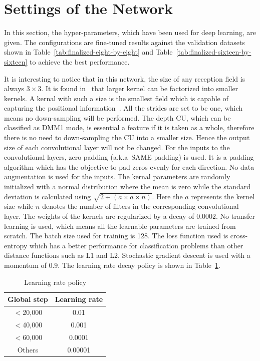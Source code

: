 \section{Settings of the Network}\label{sec:config}
In this section, the hyper-parameters, which have been
used for deep learning, are given.
The configurations are fine-tuned results against the validation
datasets shown in Table~\ref{tab:finalized-eight-by-eight}
and Table~\ref{tab:finalized-sixteen-by-sixteen} to achieve the
best performance.

It is interesting to notice that in this network, 
the size of any reception field
is always \(3\times3\).
It is found in~\parencite{RN62} that
larger kernel can be factorized into smaller kernels.
A kernal with such a size is the smallest
field which is capable of capturing the positional
information~\parencite{RN107}.
All the strides are set to be one, which means
no down-sampling will be performed.
The depth CU,
which can be classified as DMM1 mode, is essential
a feature if it is taken as a whole, therefore
there is no need to down-sampling
the CU into a smaller size.
Hence the output size of each convolutional layer
will not be changed.
For the inputs to the convolutional layers, 
zero padding (a.k.a\ SAME padding) is used.
It is a padding algorithm which has the objective
to pad zeros evenly for each direction.
No data augmentation is used for the inputs.
The kernal parameters are randomly initialized 
with a normal distribution where the mean 
is zero while the standard deviation is 
calculated using 
\(\sqrt{2\div(\mathit{a}\times\mathit{a}\times\mathit{n})}\).
Here the \(\mathit{a}\) represents the kernel size
while \(\mathit{n}\) denotes the number of filters
in the corresponding convolutional layer.
The weights of the kernels are regularized by
a decay of \(0.0002\).
No transfer learning is used, which means all the learnable 
parameters are trained from scratch.
The batch size used for training is 128.
The loss function used is cross-entropy which has
a better performance for classification problems 
than other distance functions such as L1 and L2.
Stochastic gradient descent is used with a momentum 
of \(0.9\).
The learning rate decay policy is shown in 
Table~\ref{tab:lr-policy}.

\begin{table}[H]
    \caption{Learning rate policy}
    \bigskip\label{tab:lr-policy}
    \centering
    \begin{tabular}{c c}
        \toprule
        Global step & Learning rate \\
        \midrule
        \(<\)20,000 & 0.01 \\
        \(<\)40,000 & 0.001 \\
        \(<\)60,000 & 0.0001 \\
        Others  & 0.00001 \\
        \bottomrule
    \end{tabular}
\end{table}

